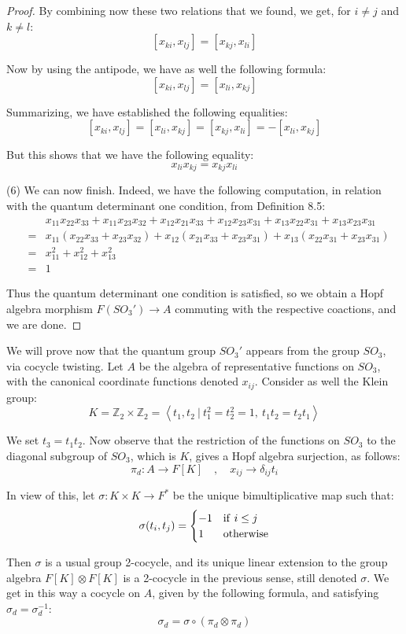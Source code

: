 \documentclass[12pt]{amsbook}
\begin{document}
\begin{proof}
By combining now these two relations that we found, we get, for $i\neq j$ and $k\neq l$:
$$[x_{ki},x_{lj}]=[x_{kj},x_{li}]$$

Now by using the antipode, we have as well the following formula:
$$[x_{ki},x_{lj}]=[x_{li},x_{kj}]$$

Summarizing, we have established the following equalities:
$$[x_{ki},x_{lj}]=[x_{li},x_{kj}]=[x_{kj},x_{li}]=-[x_{li},x_{kj}]$$

But this shows that we have the following equality:
$$x_{li}x_{kj} = x_{kj}x_{li}$$

(6) We can now finish. Indeed, we have the following computation, in relation with the quantum determinant one condition, from Definition 8.5:
\begin{eqnarray*}
&&x_{11}x_{22}x_{33}+x_{11}x_{23}x_{32}+x_{12}x_{21}x_{33}+x_{12}x_{23}x_{31}+x_{13}x_{22}x_{31}+x_{13}x_{23}x_{31}\\
&=&x_{11}(x_{22}x_{33}+x_{23}x_{32})+x_{12}(x_{21}x_{33}+x_{23}x_{31})+x_{13}(x_{22}x_{31} +x_{23}x_{31})\\
&=&x_{11}^2+x_{12}^2+x_{13}^2\\
&=&1
\end{eqnarray*}

Thus the quantum determinant one condition is satisfied, so we obtain a Hopf algebra morphism 
$F(SO_3') \to A$ commuting with the respective coactions, and we are done.
\end{proof}

We will prove now that the quantum group $SO_3'$ appears from the group $SO_3$, via cocycle twisting. Let $A$ be the algebra of representative functions on $SO_3$, with the canonical coordinate functions denoted  $x_{ij}$. Consider as well the Klein group:
$$K=\mathbb Z_2\times\mathbb Z_2=\left<t_1,t_2\ \Big|\ t_1^2=t_2^2 =1,\ t_1t_2=t_2t_1\right>$$

We set $t_3 = t_1t_2$. Now observe that the restriction of the functions on $SO_3$ to the diagonal subgroup of $SO_3$, which is $K$, gives a Hopf algebra surjection, as follows:
$$\pi_d:A\to F[K]\quad,\quad x_{ij}\to\delta_{ij}t_i$$

In view of this, let $\sigma:K\times K\to F^*$ be the unique bimultiplicative map such that:
$$\sigma(t_i,t_j)=\begin{cases}
-1&{\rm if} \ i\leq j\\
1&{\rm otherwise}
\end{cases}$$

Then $\sigma$ is a usual group 2-cocycle, and its unique linear extension to the group algebra
$F[K]\otimes F[K]$ is a 2-cocycle in the previous sense, still denoted $\sigma$. We get in this way a cocycle on $A$, given by the following formula, and satisfying $\sigma_d=\sigma_d^{-1}$:
$$\sigma_d=\sigma\circ(\pi_d \otimes \pi_d)$$
\end{document}
